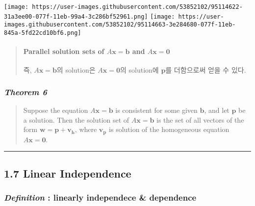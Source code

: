 \documentclass[11pt]{article}
\begin{document}
\texttt{[image: https://user-images.githubusercontent.com/53852102/95114622-31a3ee00-077f-11eb-99a4-3c286bf52961.png]}
\texttt{[image: https://user-images.githubusercontent.com/53852102/95114663-3e284680-077f-11eb-845a-5fd22cd10bf6.png]}

\begin{quote}
\mbox{}%
\hypertarget{parallel-solution-sets-of-amathbfx-mathbfb-and-amathbfx-mathbf0}{%
\paragraph{\texorpdfstring{Parallel solution sets of
\(A\mathbf{x} = \mathbf{b}\) and
\(A\mathbf{x} = \mathbf{0}\)}{Parallel solution sets of A\textbackslash{}mathbf\{x\} = \textbackslash{}mathbf\{b\} and A\textbackslash{}mathbf\{x\} = \textbackslash{}mathbf\{0\}}}\label{parallel-solution-sets-of-amathbfx-mathbfb-and-amathbfx-mathbf0}}

즉, \(A\mathbf{x} = \mathbf{b}\)의 solution은
\(A\mathbf{x} = \mathbf{0}\)의 solution에 \(\mathbf{p}\)를 더함으로써
얻을 수 있다.
\end{quote}

\hypertarget{theorem-6}{%
\subsubsection{\texorpdfstring{\emph{Theorem
6}}{Theorem 6}}\label{theorem-6}}

\begin{quote}
Suppose the equation \(A\mathbf{x} = \mathbf{b}\) is consistent for some
given \(\mathbf{b}\), and let \(\mathbf{p}\) be a solution. Then the
solution set of \(A\mathbf{x} = \mathbf{b}\) is the set of all vectors
of the form \(\mathbf{w} = \mathbf{p} + \mathbf{v_{h}}\), where
\(\mathbf{v_{p}}\) is solution of the homogeneous equation
\(A\mathbf{x} = \mathbf{0}\).
\end{quote}

    \begin{center}\rule{0.5\linewidth}{\linethickness}\end{center}

\hypertarget{linear-independence}{%
\subsection{1.7 Linear Independence}\label{linear-independence}}

\hypertarget{definition-linearly-independece-dependence}{%
\subsubsection{\texorpdfstring{\emph{Definition} : linearly independece
\&
dependence}{Definition : linearly independece \& dependence}}\label{definition-linearly-independece-dependence}}
\end{document}
